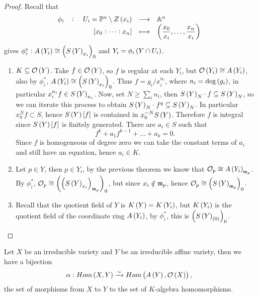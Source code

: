 \pagebreak

\begin{proof}
Recall that
$$ \function[\phi_i]{U_i = \P^n \setminus Z\br{x_i}}{\A^n}{\sbr{x_0 : \dots : x_n}}{\br{\dfrac{x_0}{x_i}, \dots, \dfrac{x_n}{x_i}}} $$
gives $ \phi_i^* : A\br{Y_i} \cong \br{S\br{Y}_{x_i}}_0 $ and $ Y_i = \phi_i\br{Y \cap U_i} $.
\begin{enumerate}
\item $ K \subseteq \OO\br{Y} $. Take $ f \in \OO\br{Y} $, so $ f $ is regular at each $ Y_i $, but $ \OO\br{Y_i} \cong A\br{Y_i} $, also by $ \phi_i^* $, $ A\br{Y_i} \cong \br{S\br{Y}_{x_i}}_0 $. Thus $ f = g_i / x_i^{n_i} $, where $ n_i = \deg\br{g_i} $, in particular $ x_i^{n_i}f \in S\br{Y}_{n_i} $. Now, set $ N \ge \sum_i n_i $, then $ S\br{Y}_N \cdot f \subseteq S\br{Y}_N $, so we can iterate this process to obtain $ S\br{Y}_N \cdot f^q \subseteq S\br{Y}_N $. In particular $ x_0^Nf \subset S $, hence $ S\br{Y}\sbr{f} $ is contained in $ x_0^{-N}S\br{Y} $. Therefore $ f $ is integral since $ S\br{Y}\sbr{f} $ is finitely generated. There are $ a_i \in S $ such that
$$ f^k + a_1f^{k - 1} + \dots + a_k = 0. $$
Since $ f $ is homogeneous of degree zero we can take the constant terms of $ a_i $ and still have an equation, hence $ a_i \in K $.
\item Let $ p \in Y $, then $ p \in Y_i $, by the previous theorem we know that $ \OO_p \cong A\br{Y_i}_{\mm_p} $. By $ \phi_i^* $, $ \OO_p \cong \br{\br{S\br{Y}_{x_i}}_{\mm_p}}_0 $, but since $ x_i \notin \mathfrak{m}_p $, hence $ \OO_p \cong \br{S\br{Y}_{\mm_p}}_0 $.
\item Recall that the quotient field of $ Y $ is $ K\br{Y} = K\br{Y_i} $, but $ K\br{Y_i} $ is the quotient field of the coordinate ring $ A\br{Y_i} $, by $ \phi_i^* $, this is $ \br{S\br{Y}_{\br{0}}}_0 $.
\end{enumerate}
\end{proof}


\begin{proposition}
Let $ X $ be an irreducible variety and $ Y $ be an irreducible affine variety, then we have a bijection
$$ \alpha : Hom\br{X, Y} \xrightarrow{\sim} Hom\br{A\br{Y}, \OO\br{X}}, $$
the set of morphisms from $ X $ to $ Y $ to the set of $ K $-algebra homomorphisms.
\end{proposition}

